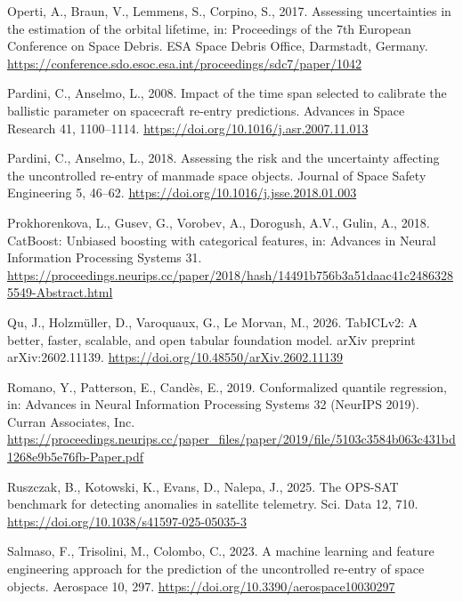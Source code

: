 \documentclass[
]{article}
\newlength{\cslhangindent}
\newenvironment{CSLReferences}[2] %
 {\begin{list}{}{%
  \setlength{\itemindent}{0pt}
  \setlength{\leftmargin}{0pt}
  \setlength{\parsep}{0pt}
  \ifodd #1
   \setlength{\leftmargin}{\cslhangindent}
   \setlength{\itemindent}{-1\cslhangindent}
  \fi
  \setlength{\itemsep}{#2\baselineskip}}}
 {\end{list}}
\begin{document}
\begin{CSLReferences}{1}{0}
Operti, A., Braun, V., Lemmens, S., Corpino, S., 2017. Assessing
uncertainties in the estimation of the orbital lifetime, in: Proceedings
of the 7th European Conference on Space Debris. ESA Space Debris Office,
Darmstadt, Germany.
\url{https://conference.sdo.esoc.esa.int/proceedings/sdc7/paper/1042}

Pardini, C., Anselmo, L., 2008. Impact of the time span selected to
calibrate the ballistic parameter on spacecraft re-entry predictions.
Advances in Space Research 41, 1100--1114.
\url{https://doi.org/10.1016/j.asr.2007.11.013}

Pardini, C., Anselmo, L., 2018. Assessing the risk and the uncertainty
affecting the uncontrolled re-entry of manmade space objects. Journal of
Space Safety Engineering 5, 46--62.
\url{https://doi.org/10.1016/j.jsse.2018.01.003}

Prokhorenkova, L., Gusev, G., Vorobev, A., Dorogush, A.V., Gulin, A.,
2018. {CatBoost}: Unbiased boosting with categorical features, in:
Advances in Neural Information Processing Systems 31.
\url{https://proceedings.neurips.cc/paper/2018/hash/14491b756b3a51daac41c24863285549-Abstract.html}

Qu, J., Holzmüller, D., Varoquaux, G., Le Morvan, M., 2026. {TabICLv2}:
A better, faster, scalable, and open tabular foundation model. arXiv
preprint arXiv:2602.11139.
\url{https://doi.org/10.48550/arXiv.2602.11139}

Romano, Y., Patterson, E., Candès, E., 2019. Conformalized quantile
regression, in: Advances in Neural Information Processing Systems 32
(NeurIPS 2019). Curran Associates, Inc.
\url{https://proceedings.neurips.cc/paper_files/paper/2019/file/5103c3584b063c431bd1268e9b5e76fb-Paper.pdf}

Ruszczak, B., Kotowski, K., Evans, D., Nalepa, J., 2025. The {OPS-SAT}
benchmark for detecting anomalies in satellite telemetry. Sci. Data 12,
710. \url{https://doi.org/10.1038/s41597-025-05035-3}

Salmaso, F., Trisolini, M., Colombo, C., 2023. A machine learning and
feature engineering approach for the prediction of the uncontrolled
re-entry of space objects. Aerospace 10, 297.
\url{https://doi.org/10.3390/aerospace10030297}


\end{CSLReferences}
\end{document}
